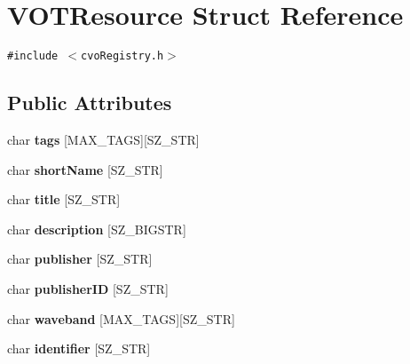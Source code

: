 \hypertarget{structVOTResource}{
\section{VOTResource Struct Reference}
\label{structVOTResource}
}
{\tt \#include $<$cvoRegistry.h$>$}

\subsection*{Public Attributes}
\begin{CompactItemize}
\item 
\hypertarget{structVOTResource_c668853475b3e6b1017ac245ca620455}{
char \textbf{tags} \mbox{[}MAX\_\-TAGS\mbox{]}\mbox{[}SZ\_\-STR\mbox{]}}
\label{structVOTResource_c668853475b3e6b1017ac245ca620455}

\item 
\hypertarget{structVOTResource_4ab7b766b4556483537af378ab38a365}{
char \textbf{shortName} \mbox{[}SZ\_\-STR\mbox{]}}
\label{structVOTResource_4ab7b766b4556483537af378ab38a365}

\item 
\hypertarget{structVOTResource_cfda4b4a8739833347b770a05bf3f0b5}{
char \textbf{title} \mbox{[}SZ\_\-STR\mbox{]}}
\label{structVOTResource_cfda4b4a8739833347b770a05bf3f0b5}

\item 
\hypertarget{structVOTResource_86f0781729046bdbe6a9fbc5fa5b0421}{
char \textbf{description} \mbox{[}SZ\_\-BIGSTR\mbox{]}}
\label{structVOTResource_86f0781729046bdbe6a9fbc5fa5b0421}

\item 
\hypertarget{structVOTResource_2b8dc106c41c7d20461ac76ae27d5ab9}{
char \textbf{publisher} \mbox{[}SZ\_\-STR\mbox{]}}
\label{structVOTResource_2b8dc106c41c7d20461ac76ae27d5ab9}

\item 
\hypertarget{structVOTResource_4a35880de97a8c701a60b71c4060b1ee}{
char \textbf{publisherID} \mbox{[}SZ\_\-STR\mbox{]}}
\label{structVOTResource_4a35880de97a8c701a60b71c4060b1ee}

\item 
\hypertarget{structVOTResource_1562b466952fae5a4f6a6ea8eff153b2}{
char \textbf{waveband} \mbox{[}MAX\_\-TAGS\mbox{]}\mbox{[}SZ\_\-STR\mbox{]}}
\label{structVOTResource_1562b466952fae5a4f6a6ea8eff153b2}

\item 
\hypertarget{structVOTResource_68d75658f7b2269d6e955d0f4ca9d365}{
char \textbf{identifier} \mbox{[}SZ\_\-STR\mbox{]}}
\label{structVOTResource_68d75658f7b2269d6e955d0f4ca9d365}


\end{CompactItemize}
